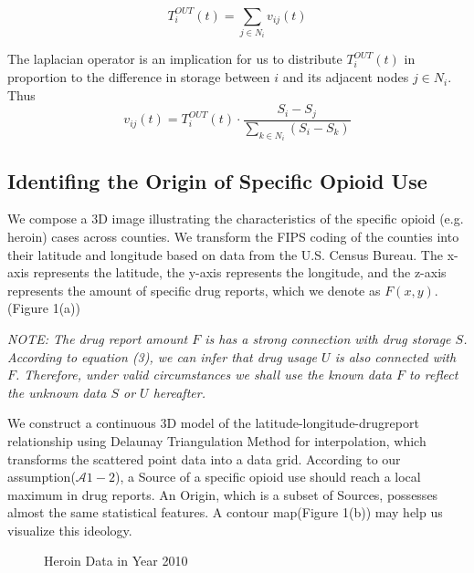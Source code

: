 \begin{equation}
T^{OUT}_i(t) = \sum_{j\in N_i}v_{ij}(t)
\end{equation}

The laplacian operator is an implication for us to distribute $T^{OUT}_i(t)$ in proportion to the difference in storage between $i$ and its adjacent nodes $j \in N_i$. Thus
\begin{equation}
v_{ij}(t) = T^{OUT}_i(t)\cdot \frac{S_i - S_j}{\sum_{k \in N_i}(S_i - S_k)}
\end{equation}



\subsection{Identifing the Origin of Specific Opioid Use}
We compose a 3D image illustrating the characteristics of the specific opioid (e.g. heroin) cases across counties. We transform the FIPS coding of the counties into their latitude and longitude based on data from the U.S. Census Bureau\cite{14}. The x-axis represents the latitude, the y-axis represents the longitude, and the z-axis represents the amount of specific drug reports, which we denote as $F(x,y)$.(Figure 1(a))

\textit{NOTE: The drug report amount $F$ is has a strong connection with drug storage $S$. According to equation (3), we can infer that drug usage $U$ is also connected with $F$. Therefore, under valid circumstances we shall use the known data $F$ to reflect the unknown data $S$ or $U$ hereafter.}

We construct a continuous 3D model of the latitude-longitude-drugreport relationship using Delaunay Triangulation Method for interpolation, which transforms the scattered point data into a data grid. According to our assumption($\mathcal{A}1-2$), a Source of a specific opioid use should reach a local maximum in drug reports. An Origin, which is a subset of Sources, possesses almost the same statistical features. A contour map(Figure 1(b)) may help us visualize this ideology.

\begin{figure}[H]
	\centering
	\caption{Heroin Data in Year 2010}
\end{figure}

